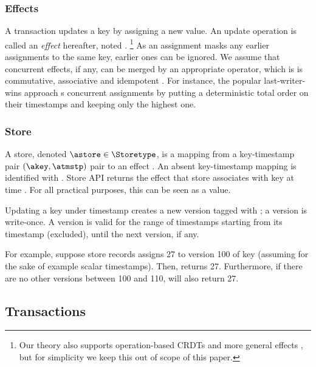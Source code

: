 \subsubsection{Effects}

A transaction updates a key by assigning a new value.
An update operation is called an \emph{effect} hereafter, noted
\aeffect{}.%
%
\footnote{
%
  Our theory also supports operation-based CRDTs and more general
  effects \cite{syn:rep:sh143}, but for simplicity we keep this out of
  scope of this paper.
}
%
As an assignment masks any earlier assignments to the same key, earlier
ones can be ignored.
We assume that concurrent effects, if any, can be merged by an
appropriate \merge{} operator, which is is commutative, associative and
idempotent \cite{syn:rep:sh143, app:rep:1716}.
For instance, the popular last-writer-wins approach \merge{}s concurrent
assignments by putting a deterministic total order on their timestamps
and keeping only the highest one.

\subsubsection{Store}

A store, denoted $\astore \in \Storetype$, is a mapping from a
key-timestamp pair $(\akey,\atmstp)$ pair to an effect \aeffect{}.
An absent key-timestamp mapping is identified with \bottom{}.
Store API \cmdLookup{\astore{}}{\akey{}}{\atmstp{}} returns the effect
that store \astore{} associates with key \akey{} at time \atmstp{}.
For all practical purposes, this can be seen as a value.

Updating a key \akey{} under timestamp \atmstp{}
creates a new version tagged with \atmstp{}; a version is write-once.
A version is valid for the range of timestamps starting from its 
timestamp (excluded), until the next version, if any.

For example, suppose store \astore{} records assigns 27 to version 100 of
key \akey{} (assuming for the sake of example scalar timestamps).
Then,  
returns 27.
Furthermore, if there are no other versions between 100 and 110,
 will also return 27.


\subsection{Transactions}
\label{sec:timestamps-and-transactions}

